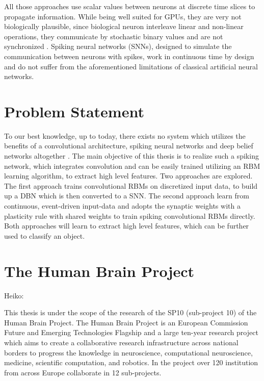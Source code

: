 All those approaches use scalar values between neurons at discrete time slices to propagate information. 
While being well suited for GPUs, they are very not biologically plausible, since biological neuron interleave linear and non-linear operations, they communicate by stochastic binary values and are not synchronized \cite{bengio2015towards}. 
Spiking neural networks (SNNs), designed to simulate the communication between neurons with spikes, work in continuous time by design and do not suffer from the aforementioned limitations of classical artificial neural networks.

\section{Problem Statement} \label{c:probstate}

To our best knowledge, up to today, there exists no system which utilizes the benefits of a convolutional architecture, spiking neural networks and deep belief networks altogether . 
The main objective of this thesis is to realize such a spiking network, which integrates convolution and can be easily trained utilizing an RBM learning algorithm, to extract high level features. 
Two approaches are explored. 
The first approach trains convolutional RBMs on discretized input data, to build up a DBN which is then converted to a SNN. 
The second approach learn from continuous, event-driven input-data and adopts the synaptic weights with a plasticity rule with shared weights to train spiking convolutional RBMs directly. 
Both approaches will learn to extract high level features, which can be further used to classify an object. 

\section{The Human Brain Project} \label{c:thehbp}

Heiko:

This thesis is under the scope of the research of the SP10 (sub-project 10) of the Human Brain
Project. The Human Brain Project is an European Commission Future and Emerging Technologies Flagship and a large ten-year research project which aims to create a collaborative research infrastructure across national borders to progress the knowledge in neuroscience, computational neuroscience, medicine, scientific computation, and robotics. In the project over 120
institution from across Europe collaborate in 12 sub-projects.

